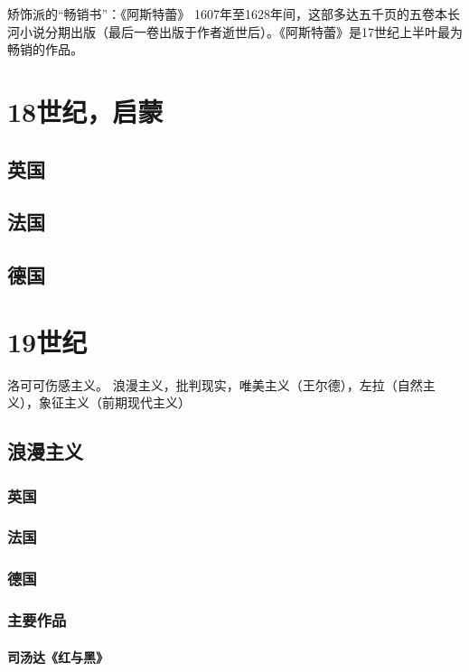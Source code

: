 \documentclass[UTF8]{../RepresentationUniverse}
\begin{document}
矫饰派的“畅销书”：《阿斯特蕾》
1607年至1628年间，这部多达五千页的五卷本长河小说分期出版（最后一卷出版于作者逝世后）。《阿斯特蕾》是17世纪上半叶最为畅销的作品。


\chapter{18世纪，启蒙}


\section{英国}

\section{法国}

\section{德国}



\chapter{19世纪}

洛可可伤感主义。
浪漫主义，批判现实，唯美主义（王尔德），左拉（自然主义），象征主义（前期现代主义）


\section{浪漫主义}


\subsection{英国}

\subsection{法国}

\subsection{德国}

\subsection{主要作品}

\subsubsection{司汤达《红与黑》}
\end{document}
